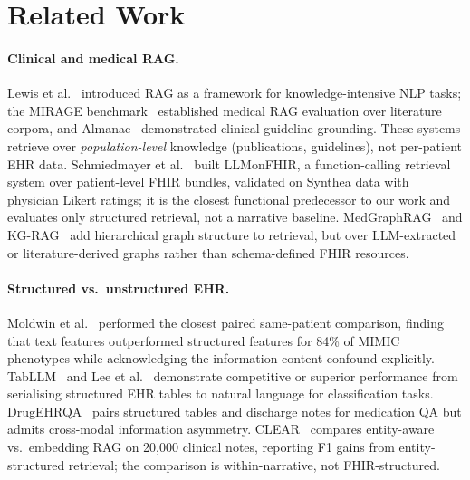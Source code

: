 \section{Related Work}
\label{sec:related}

\paragraph{Clinical and medical RAG.}
Lewis et al.~\citep{lewis2020retrieval} introduced RAG as a framework for knowledge-intensive
NLP tasks; the MIRAGE benchmark~\citep{xiong2024benchmarking} established medical RAG evaluation
over literature corpora, and Almanac~\citep{zakka2024almanac} demonstrated clinical guideline
grounding.  These systems retrieve over \emph{population-level} knowledge (publications,
guidelines), not per-patient EHR data.  Schmiedmayer et al.~\citep{schmiedmayer2025llmonfhir}
built LLMonFHIR, a function-calling retrieval system over patient-level FHIR bundles,
validated on Synthea data with physician Likert ratings; it is the closest functional
predecessor to our work and evaluates only structured retrieval, not a narrative baseline.
MedGraphRAG~\citep{wu2024medgraphrag} and KG-RAG~\citep{soman2024biomedical} add
hierarchical graph structure to retrieval, but over LLM-extracted or literature-derived graphs
rather than schema-defined FHIR resources.

\paragraph{Structured vs.\ unstructured EHR.}
Moldwin et al.~\citep{moldwin2021empirical} performed the closest paired same-patient
comparison, finding that text features outperformed structured features for 84\% of
MIMIC phenotypes while acknowledging the information-content confound explicitly.  TabLLM~\citep{hegselmann2023tabllm}
and Lee et al.~\citep{lee2025pseudonotes} demonstrate competitive or superior performance from
serialising structured EHR tables to natural language for classification tasks.  DrugEHRQA~\citep{bardhan2022drugehrqa}
pairs structured tables and discharge notes for medication QA but admits cross-modal
information asymmetry.  CLEAR~\citep{lopez2025clinical} compares entity-aware vs.\ embedding
RAG on 20,000 clinical notes, reporting F1 gains from entity-structured retrieval; the
comparison is within-narrative, not FHIR-structured.

